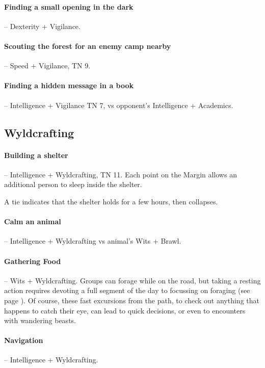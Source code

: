 \begin{multicols}{2}
\paragraph{Finding a small opening in the dark} -- Dexterity + Vigilance.

\paragraph{Scouting the forest for an enemy camp nearby} -- Speed + Vigilance, TN 9.

\paragraph{Finding a hidden message in a book} -- Intelligence + Vigilance TN 7, vs opponent's Intelligence + Academics.

\subsection{Wyldcrafting}

\paragraph{Building a shelter} -- Intelligence + Wyldcrafting, TN 11.
Each point on the Margin allows an additional person to sleep inside the shelter.

A tie indicates that the shelter holds for a few hours, then collapses.

\paragraph{Calm an animal} -- Intelligence + Wyldcrafting vs animal's Wits + Brawl.

\paragraph{Gathering Food} -- Wits + Wyldcrafting.
Groups can forage while on the road, but taking a resting action requires devoting a full segment of the day to focussing on foraging (see page \pageref{daytimes}).
Of course, these fast excursions from the path, to check out anything that happens to catch their eye, can lead to quick decisions, or even to encounters with wandering beasts.

\paragraph{Navigation} -- Intelligence + Wyldcrafting.
\label{marching}
\begin{itemize}


\end{itemize}
\end{multicols}
